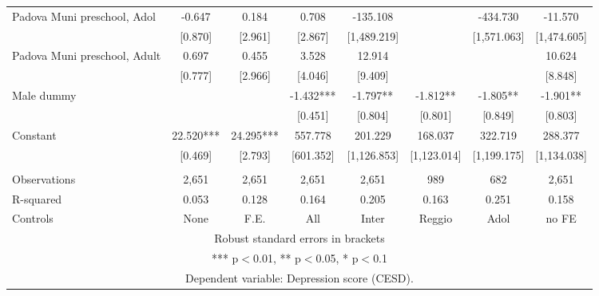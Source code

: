 \begin{tabular}{lccccccc}
Padova Muni preschool, Adol & -0.647 & 0.184 & 0.708 & -135.108 &  & -434.730 & -11.570 \\
 & [0.870] & [2.961] & [2.867] & [1,489.219] &  & [1,571.063] & [1,474.605] \\
Padova Muni preschool, Adult & 0.697 & 0.455 & 3.528 & 12.914 &  &  & 10.624 \\
 & [0.777] & [2.966] & [4.046] & [9.409] &  &  & [8.848] \\
Male dummy &  &  & -1.432*** & -1.797** & -1.812** & -1.805** & -1.901** \\
 &  &  & [0.451] & [0.804] & [0.801] & [0.849] & [0.803] \\
Constant & 22.520*** & 24.295*** & 557.778 & 201.229 & 168.037 & 322.719 & 288.377 \\
 & [0.469] & [2.793] & [601.352] & [1,126.853] & [1,123.014] & [1,199.175] & [1,134.038] \\
 &  &  &  &  &  &  &  \\
Observations & 2,651 & 2,651 & 2,651 & 2,651 & 989 & 682 & 2,651 \\
R-squared & 0.053 & 0.128 & 0.164 & 0.205 & 0.163 & 0.251 & 0.158 \\
 Controls & None & F.E. & All & Inter & Reggio & Adol & no FE \\ \hline
\multicolumn{8}{c}{ Robust standard errors in brackets} \\
\multicolumn{8}{c}{ *** p$<$0.01, ** p$<$0.05, * p$<$0.1} \\
\multicolumn{8}{c}{ Dependent variable: Depression score (CESD).} \\
\end{tabular}
